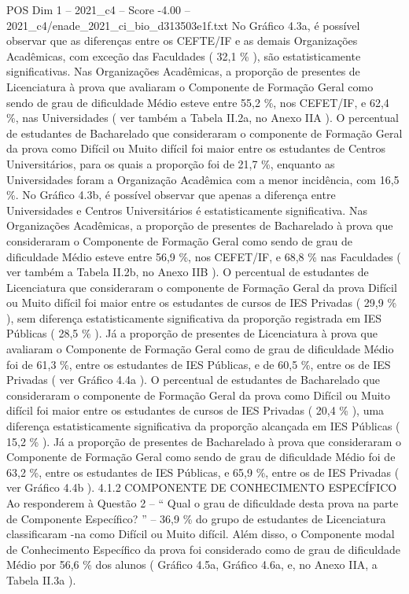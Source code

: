 \begin{textsample}{POS Dim 1 – 2021\_c4 – Score -4.00 – 2021\_c4/enade\_2021\_ci\_bio\_d313503e1f.txt}
No Gráfico 4.3a, é possível observar que as diferenças entre os CEFTE/IF e as demais Organizações Acadêmicas, com exceção das Faculdades ( 32,1 \% ), são estatisticamente significativas.
Nas Organizações Acadêmicas, a proporção de presentes de Licenciatura à prova que avaliaram o Componente de Formação Geral como sendo de grau de dificuldade Médio esteve entre 55,2 \%, nos CEFET/IF, e 62,4 \%, nas Universidades ( ver também a Tabela II.2a, no Anexo IIA ).
O percentual de estudantes de Bacharelado que consideraram o componente de Formação Geral da prova como Difícil ou Muito difícil foi maior entre os estudantes de Centros Universitários, para os quais a proporção foi de 21,7 \%, enquanto as Universidades foram a Organização Acadêmica com a menor incidência, com 16,5 \%.
No Gráfico 4.3b, é possível observar que apenas a diferença entre Universidades e Centros Universitários é estatisticamente significativa.
Nas Organizações Acadêmicas, a proporção de presentes de Bacharelado à prova que consideraram o Componente de Formação Geral como sendo de grau de dificuldade Médio esteve entre 56,9 \%, nos CEFET/IF, e 68,8 \% nas Faculdades ( ver também a Tabela II.2b, no Anexo IIB ).
O percentual de estudantes de Licenciatura que consideraram o componente de Formação Geral da prova Difícil ou Muito difícil foi maior entre os estudantes de cursos de IES Privadas ( 29,9 \% ), sem diferença estatisticamente significativa da proporção registrada em IES Públicas ( 28,5 \% ).
Já a proporção de presentes de Licenciatura à prova que avaliaram o Componente de Formação Geral como de grau de dificuldade Médio foi de 61,3 \%, entre os estudantes de IES Públicas, e de 60,5 \%, entre os de IES Privadas ( ver Gráfico 4.4a ).
O percentual de estudantes de Bacharelado que consideraram o componente de Formação Geral da prova como Difícil ou Muito difícil foi maior entre os estudantes de cursos de IES Privadas ( 20,4 \% ), uma diferença estatisticamente significativa da proporção alcançada em IES Públicas ( 15,2 \% ).
Já a proporção de presentes de Bacharelado à prova que consideraram o Componente de Formação Geral como sendo de grau de dificuldade Médio foi de 63,2 \%, entre os estudantes de IES Públicas, e 65,9 \%, entre os de IES Privadas ( ver Gráfico 4.4b ). 4.1.2 COMPONENTE DE CONHECIMENTO ESPECÍFICO Ao responderem à Questão 2 – “ Qual o grau de dificuldade desta prova na parte de Componente Específico? ” – 36,9 \% do grupo de estudantes de Licenciatura classificaram -na como Difícil ou Muito difícil.
Além disso, o Componente modal de Conhecimento Específico da prova foi considerado como de grau de dificuldade Médio por 56,6 \% dos alunos ( Gráfico 4.5a, Gráfico 4.6a, e, no Anexo IIA, a Tabela II.3a ).

\end{textsample}
